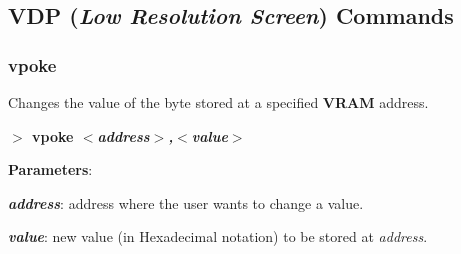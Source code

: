 \documentclass[a4paper,11pt]{article}
\begin{document}
        
        

        



        

    \subsection{VDP (\textit{Low Resolution Screen}) Commands}\label{vdpcmds}
        \subsubsection{{\color{blue}vpoke}}
        Changes the value of the byte stored at a specified \textbf{VRAM}
        address.

        \hspace{1.9cm}\textbf{$>$ vpoke \textit{$<$address$>$,$<$value$>$}}

        \textbf{Parameters}:

        \hspace{1cm}\textbf{\textit{address}}: address where the user wants
        to change a value.
        
        \hspace{1cm}\textbf{\textit{value}}: new value (in Hexadecimal notation)
        to be stored at \textit{address}.
\end{document}

